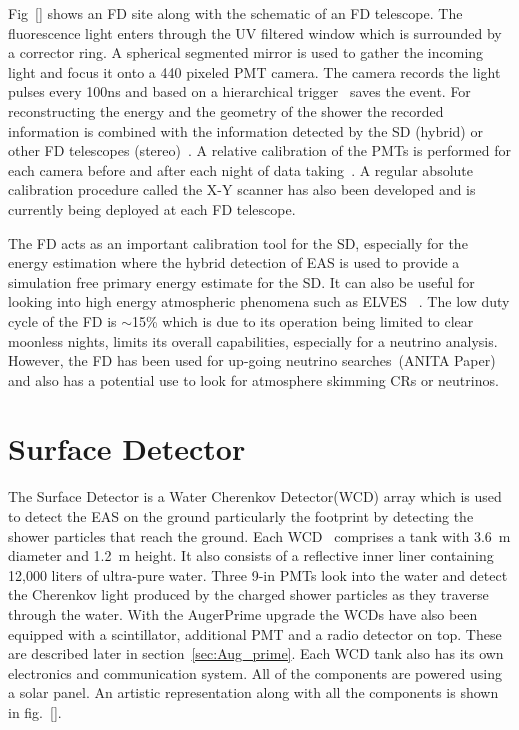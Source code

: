 Fig~\ref{} shows an FD site along with the schematic of an FD telescope. The fluorescence light enters through the UV filtered window 
which is surrounded by a corrector ring. A spherical segmented mirror is used to gather the incoming light and focus it onto a 440 pixeled PMT camera. The camera records the light pulses every 100ns and based on a hierarchical trigger~\cite{Abraham_2010_FD} saves the event. For reconstructing the energy and the geometry of the shower the recorded information is combined with the information detected by the SD (hybrid) or other FD telescopes (stereo)~\cite{SALAMIDA2008207}. A relative calibration of the PMTs is performed for each camera before and after each night of data taking~\cite{Abraham_2010_FD}. A regular absolute calibration procedure called the X-Y scanner has also been developed and is currently being deployed at each FD telescope. 

The FD acts as an important calibration tool for the SD, especially for the energy estimation where the hybrid detection of EAS is used to provide a simulation free primary energy estimate for the SD. It can also be useful for looking into high energy atmospheric phenomena such as ELVES ~\cite{PierreAuger:2020lri}. The low duty cycle of the FD is $\sim$15\% which is due to its operation being limited to clear moonless nights, limits its overall capabilities, especially for a neutrino analysis. However, the FD has been used for up-going neutrino searches~\cite{}(ANITA Paper) and also has a potential use to look for atmosphere skimming CRs or neutrinos.  

\section{Surface Detector}
\label{sec:Sur_det}
The Surface Detector is a Water Cherenkov Detector(WCD) array which is used to detect the EAS on the ground particularly the footprint by detecting the shower particles that reach the ground. Each WCD~\cite{PierreAuger:2007kus} comprises a tank with 3.6 m diameter and 1.2 m height. It also consists of a reflective inner liner containing 12,000 liters of ultra-pure water. Three 9-in PMTs look into the water and detect the Cherenkov light produced by the charged shower particles as they traverse through the water. With the AugerPrime upgrade the WCDs have also been equipped with a scintillator, additional PMT and a radio detector on top. These are described later in section~\ref{sec:Aug_prime}. Each WCD tank also has its own electronics and communication system. All of the components are powered using a solar panel. An artistic representation along with all the components is shown in fig.~\ref{}. 

